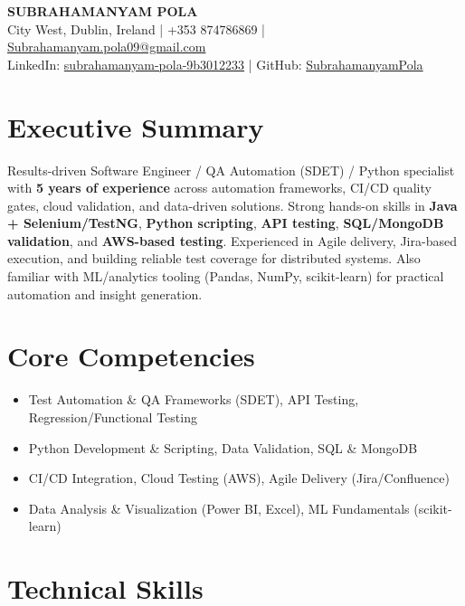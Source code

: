 \documentclass[11pt,a4paper]{article}
\begin{document}
{\LARGE \textbf{SUBRAHAMANYAM POLA}}\\
City West, Dublin, Ireland \;\;|\;\; +353 874786869 \;\;|\;\; \href{mailto:Subrahamanyam.pola09@gmail.com}{Subrahamanyam.pola09@gmail.com}\\
LinkedIn: \href{https://www.linkedin.com/in/subrahamanyam-pola-9b3012233/}{subrahamanyam-pola-9b3012233} \;\;|\;\; GitHub: \href{https://github.com/SubrahamanyamPola}{SubrahamanyamPola}

\section*{Executive Summary}
Results-driven Software Engineer / QA Automation (SDET) / Python specialist with \textbf{5 years of experience} across automation frameworks, CI/CD quality gates, cloud validation, and data-driven solutions. Strong hands-on skills in \textbf{Java + Selenium/TestNG}, \textbf{Python scripting}, \textbf{API testing}, \textbf{SQL/MongoDB validation}, and \textbf{AWS-based testing}. Experienced in Agile delivery, Jira-based execution, and building reliable test coverage for distributed systems. Also familiar with ML/analytics tooling (Pandas, NumPy, scikit-learn) for practical automation and insight generation.

\section*{Core Competencies}
\begin{itemize}
  \item Test Automation \& QA Frameworks (SDET), API Testing, Regression/Functional Testing
  \item Python Development \& Scripting, Data Validation, SQL \& MongoDB
  \item CI/CD Integration, Cloud Testing (AWS), Agile Delivery (Jira/Confluence)
  \item Data Analysis \& Visualization (Power BI, Excel), ML Fundamentals (scikit-learn)
\end{itemize}

\section{Technical Skills}

\end{document}
